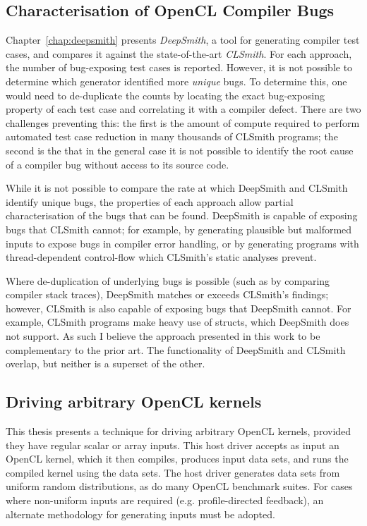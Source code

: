 \subsection{Characterisation of OpenCL Compiler Bugs}

Chapter~\ref{chap:deepsmith} presents \emph{DeepSmith}, a tool for generating compiler test cases, and compares it against the state-of-the-art \emph{CLSmith}. For each approach, the number of bug-exposing test cases is reported. However, it is not possible to determine which generator identified more \emph{unique} bugs. To determine this, one would need to de-duplicate the counts by locating the exact bug-exposing property of each test case and correlating it with a compiler defect. There are two challenges preventing this: the first is the amount of compute required to perform automated test case reduction in many thousands of CLSmith programs; the second is the that in the general case it is not possible to identify the root cause of a compiler bug without access to its source code.

While it is not possible to compare the rate at which DeepSmith and CLSmith identify unique bugs, the properties of each approach allow partial characterisation of the bugs that can be found. DeepSmith is capable of exposing bugs that CLSmith cannot; for example, by generating plausible but malformed inputs to expose bugs in compiler error handling, or by generating programs with thread-dependent control-flow which CLSmith's static analyses prevent.

Where de-duplication of underlying bugs is possible (such as by comparing compiler stack traces), DeepSmith matches or exceeds CLSmith's findings; however, CLSmith is also capable of exposing bugs that DeepSmith cannot. For example, CLSmith programs make heavy use of structs, which DeepSmith does not support. As such I believe the approach presented in this work to be complementary to the prior art. The functionality of DeepSmith and CLSmith overlap, but neither is a superset of the other.


\subsection{Driving arbitrary OpenCL kernels}

This thesis presents a technique for driving arbitrary OpenCL kernels, provided they have regular scalar or array inputs. This host driver accepts as input an OpenCL kernel, which it then compiles, produces input data sets, and runs the compiled kernel using the data sets. The host driver generates data sets from uniform random distributions, as do many OpenCL benchmark suites. For cases where non-uniform inputs are required (e.g. profile-directed feedback), an alternate methodology for generating inputs must be adopted.


